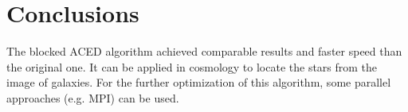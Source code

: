 \documentclass[letterpaper]{article}
\begin{document}
%

\section{Conclusions}
The blocked ACED algorithm achieved comparable results and faster speed than the original one. It can be applied in cosmology to locate the stars from the image of galaxies. For the further optimization of this algorithm, some parallel approaches (e.g. MPI) can be used.  
\end{document}
